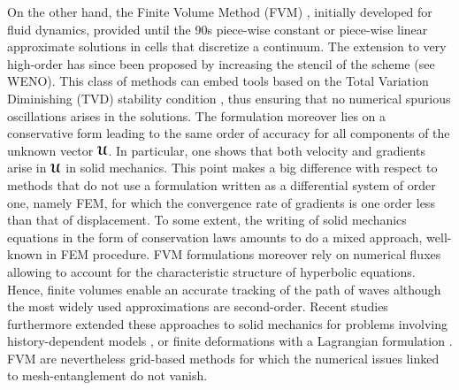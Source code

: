On the other hand, the Finite Volume Method (FVM) \cite{Leveque}, initially developed for fluid dynamics, provided until the 90s piece-wise constant or piece-wise linear approximate solutions in cells that discretize a continuum.
The extension to very high-order has since been proposed by increasing the stencil of the scheme (see WENO).
This class of methods can embed tools based on the Total Variation Diminishing (TVD) stability condition \cite{Harten}, thus ensuring that no numerical spurious oscillations arises in the solutions. 
The formulation moreover lies on a conservative form leading to the same order of accuracy for all components of the unknown vector ${\boldsymbol{\mathcal{U}}}$.
In particular, one shows that both velocity and gradients arise in ${\boldsymbol{\mathcal{U}}}$ in solid mechanics.
This point makes a big difference with respect to methods that do not use a formulation written as a differential system of order one, namely FEM, for which the convergence rate of gradients is one order less than that of displacement.
To some extent, the writing of solid mechanics equations in the form of conservation laws amounts to do a mixed approach, well-known in FEM procedure.
FVM formulations moreover rely on numerical fluxes allowing to account for the characteristic structure of hyperbolic equations.
Hence, finite volumes enable an accurate tracking of the path of waves although the most widely used approximations are second-order. %
Recent studies furthermore extended these approaches to solid mechanics for problems involving history-dependent models \cite{Gavrilyuk,Thomas_EP}, or finite deformations with a Lagrangian formulation \cite{Lee_FVM,Haider_FVM}.
FVM are nevertheless grid-based methods for which the numerical issues linked to mesh-entanglement do not vanish. %

